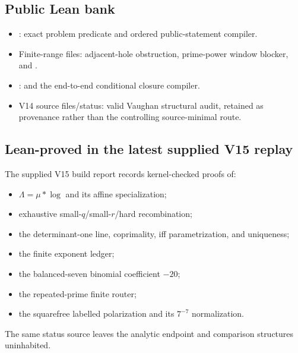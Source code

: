\documentclass[11pt]{article}
\theoremstyle{definition}
\newcommand{\1}{\mathbf 1}
\begin{document}
{{{\subsection*{Public Lean bank}
\begin{itemize}[leftmargin=1.6em,itemsep=0.4em]
\item {}: exact problem predicate and
  ordered public-statement compiler.
\item Finite-range files: adjacent-hole obstruction, prime-power window blocker, and
  .
\item {}:  and
  the end-to-end conditional closure compiler.
\item V14 source files/status: valid Vaughan structural audit, retained as provenance rather
  than the controlling source-minimal route.
\end{itemize}

\subsection*{Lean-proved in the latest supplied V15 replay}
The supplied V15 build report records kernel-checked proofs of:
\begin{itemize}[leftmargin=1.6em,itemsep=0.35em]
\item $\Lambda=\mu*\log$ and its affine specialization;
\item exhaustive small-$q$/small-$r$/hard recombination;
\item the determinant-one line, coprimality, iff parametrization, and uniqueness;
\item the finite exponent ledger;
\item the balanced-seven binomial coefficient $-20$;
\item the repeated-prime finite router;
\item the squarefree labelled polarization and its $7^{-7}$ normalization.
\end{itemize}
The same status source leaves the analytic endpoint and comparison structures uninhabited.

}}}
\end{document}
